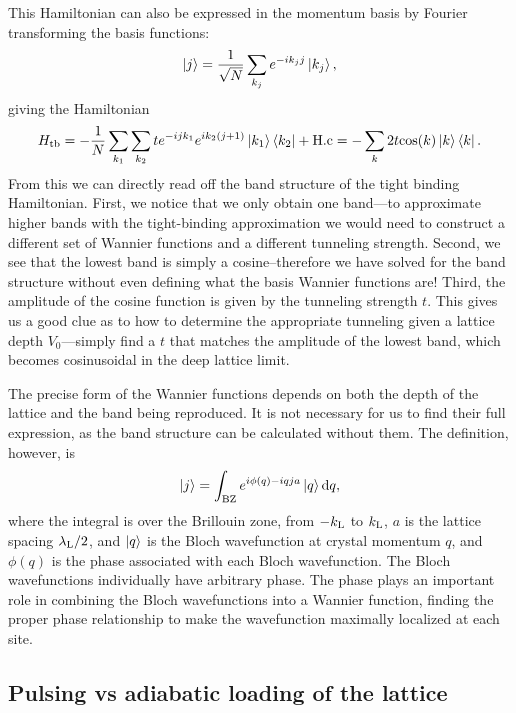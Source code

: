 This Hamiltonian can also be expressed in the momentum basis by Fourier transforming the basis functions:
\begin{equation}
\mathinner{|{j}\rangle} = \frac{1}{\sqrt{N}}\sum_{k_j} e^{-i k_j j}\mathinner{|{k_j}\rangle},
\end{equation}
giving the Hamiltonian
\begin{equation}
H_{\rm tb} = - \frac{1}{N}\sum_{k_1}\sum_{k_2} t e^{-i j k_1} e^{i k_2 (j+1)} \mathinner{|{k_1}\rangle}\mathinner{\langle{k_2}|} + {\rm H.c} =-\sum_k 2 t {\rm cos}(k)\mathinner{|{k}\rangle}\mathinner{\langle{k}|}.
\end{equation}  
From this we can directly read off the band structure of the tight binding Hamiltonian. First, we notice that we only obtain one band---to approximate higher bands with the tight-binding approximation we would need to construct a different set of Wannier functions and a different tunneling strength. Second, we see that the lowest band is simply a cosine--therefore we have solved for the band structure without even defining what the basis Wannier functions are! Third, the amplitude of the cosine function is given by the tunneling strength $t$. This gives us a good clue as to how to determine the appropriate tunneling given a lattice depth $V_0$---simply find a $t$ that matches the amplitude of the lowest band, which becomes cosinusoidal in the deep lattice limit. 

The precise form of the Wannier functions depends on both the depth of the lattice and the band being reproduced. It is not necessary for us to find their full expression, as the band structure can be calculated without them. The definition, however, is
\begin{equation}
\mathinner{|{j}\rangle} = \int_{\rm BZ} e^{i \phi(q) - i q j a}\mathinner{|{q}\rangle} {\rm d} q,
\end{equation}
where the integral is over the Brillouin zone, from $-k_{\rm L}$ to $k_{\rm L}$, $a$ is the lattice spacing $\lambda_{\rm L}/2$, and $\mathinner{|{q}\rangle}$ is the Bloch wavefunction at crystal momentum $q$, and $\phi(q)$ is the phase associated with each Bloch wavefunction. The Bloch wavefunctions individually have arbitrary phase. The phase plays an important role in combining the Bloch wavefunctions into a Wannier function, finding the proper phase relationship to make the wavefunction maximally localized at each site\cite{Marzari2012}. 

\subsection{Pulsing vs adiabatic loading of the lattice}\label{sec:LatticeCalib}

